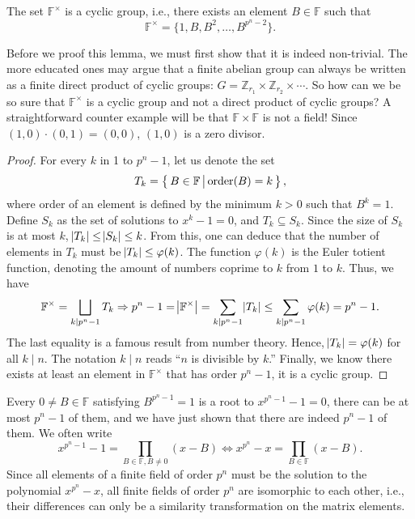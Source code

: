 \begin{lemma}
    The set $\mathbb{F}^\times$ is a cyclic group, i.e., there exists an element $B\in\mathbb{F}$ such that
    \begin{equation*}
        \mathbb{F}^\times=\{1,B,B^2,\ldots,B^{p^{n}-2}\}.
    \end{equation*}
\end{lemma}
Before we proof this lemma, we must first show that it is indeed non-trivial. The more educated ones may argue that a finite abelian group can always be written as a finite direct product of cyclic groups: $G=\mathbb{Z}_{r_1}\times\mathbb{Z}_{r_2}\times\cdots$. So how can we be so sure that $\mathbb{F}^\times$ is a cyclic group and not a direct product of cyclic groups? A straightforward counter example will be that $\mathbb{F}\times\mathbb{F}$ is not a field! Since $(1,0)\cdot(0,1)=(0,0)$, $(1,0)$ is a zero divisor.
\begin{proof}
    For every $k$ in 1 to $p^n-1$, let us denote the set
    \begin{equation*}
        T_k = \left\{\,{B\in\mathbb{F}}\,\middle\vert\,{\mathrm{order}(B)=k}\,\right\},
    \end{equation*}
    where order of an element is defined by the minimum $k>0$ such that $B^k=1$. Define $S_k$ as the set of solutions to $x^k-1=0$, and $T_k\subseteq S_k$. Since the size of $S_k$ is at most $k$, $\abs{T_k} \le \abs{S_k} \le k$. From this, one can deduce that the number of elements in $T_k$ must be $\abs{T_k} \le \varphi(k)$. The function $\varphi(k)$ is the Euler totient function, denoting the amount of numbers coprime to $k$ from $1$ to $k$. Thus, we have
    \begin{equation*}
        \mathbb{F}^\times = \bigsqcup_{k\mid p^n-1}T_k \Rightarrow p^n-1=\abs{\mathbb{F}^\times} = \sum_{k\mid p^n-1} \abs{T_k} \le \sum_{k\mid p^n-1}\varphi(k) = p^n-1.
    \end{equation*}
    The last equality is a famous result from number theory. Hence, $\abs{T_k}=\varphi(k)$ for all $k\mid n$. The notation $k\mid n$ reads ``$n$ is divisible by $k$.'' Finally, we know there exists at least an element in $\mathbb{F}^\times$ that has order $p^n-1$, it is a cyclic group.
\end{proof}

Every $0\neq B\in\mathbb{F}$ satisfying $B^{p^n-1}=1$ is a root to $x^{p^n-1}-1=0$, there can be at most $p^n-1$ of them, and we have just shown that there are indeed $p^n-1$ of them. We often write
\begin{equation}
    x^{p^n-1} - 1= \prod_{B\in\mathbb{F},B\neq0}(x-B) \Longleftrightarrow x^{p^n} - x= \prod_{B\in\mathbb{F}}(x-B).
\end{equation}
Since all elements of a finite field of order $p^n$ must be the solution to the polynomial $x^{p^n}-x$, all finite fields of order $p^n$ are isomorphic to each other, i.e., their differences can only be a similarity transformation on the matrix elements.


